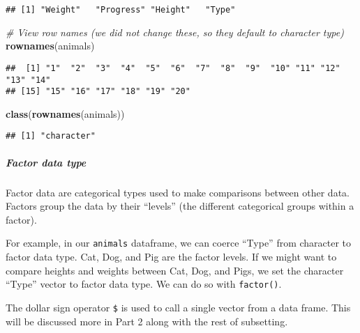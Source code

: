 \documentclass[]{article}
\newenvironment{Shaded}{\begin{snugshade}}{\end{snugshade}}
\newcommand{\KeywordTok}[1]{\textcolor[rgb]{0.13,0.29,0.53}{\textbf{#1}}}
\newcommand{\CommentTok}[1]{\textcolor[rgb]{0.56,0.35,0.01}{\textit{#1}}}
\newcommand{\NormalTok}[1]{#1}
\let\oldsubparagraph\subparagraph
\renewcommand{\subparagraph}[1]{\oldsubparagraph{#1}\mbox{}}
\begin{document}
\begin{verbatim}
## [1] "Weight"   "Progress" "Height"   "Type"
\end{verbatim}

\begin{Shaded}
\begin{Highlighting}[]
\CommentTok{# View row names (we did not change these, so they default to character type)}
\KeywordTok{rownames}\NormalTok{(animals)}
\end{Highlighting}
\end{Shaded}

\begin{verbatim}
##  [1] "1"  "2"  "3"  "4"  "5"  "6"  "7"  "8"  "9"  "10" "11" "12" "13" "14"
## [15] "15" "16" "17" "18" "19" "20"
\end{verbatim}

\begin{Shaded}
\begin{Highlighting}[]
\KeywordTok{class}\NormalTok{(}\KeywordTok{rownames}\NormalTok{(animals))}
\end{Highlighting}
\end{Shaded}

\begin{verbatim}
## [1] "character"
\end{verbatim}

\subparagraph{Factor data type}\label{factor-data-type}

Factor data are categorical types used to make comparisons between other
data. Factors group the data by their ``levels'' (the different
categorical groups within a factor).

For example, in our \texttt{animals} dataframe, we can coerce ``Type''
from character to factor data type. Cat, Dog, and Pig are the factor
levels. If we might want to compare heights and weights between Cat,
Dog, and Pigs, we set the character ``Type'' vector to factor data type.
We can do so with \texttt{factor()}.

The dollar sign operator \texttt{\$} is used to call a single vector
from a data frame. This will be discussed more in Part 2 along with the
rest of subsetting.

\begin{Shaded}
\end{Shaded}
\end{document}
